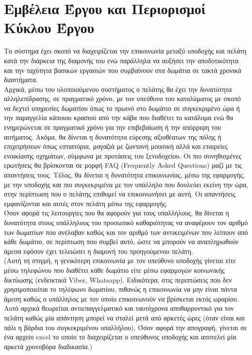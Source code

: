 \section{Εμβέλεια Έργου και Περιορισμοί Κύκλου Έργου}		
Το σύστημα έχει σκοπό να διαχειρίζεται την επικοινωνία μεταξύ υποδοχής και πελάτη κατά την διάρκεια 
της διαμονής του ενώ παράλληλα να αυξήσει την αποδοτικότητα και την ταχύτητα βασικών εργασιών που 
συμβαίνουν στα δωμάτια σε τακτά χρονικά διαστήματα.\\

\noindent
Αρχικά, μέσω του υλοποιούμενου συστήματος ο πελάτης θα έχει την δυνατότητα αλληλεπίδρασης, σε 
πραγματικό χρόνο, με τον υπεύθυνο του καταλύματος με σκοπό να δεχτεί υπηρεσίες δωματίου όπως το 
πρωινό στο δωμάτιο σε συγκεκριμένο ώρα ή την παραγγελία κάποιου κρασιού από την κάβα που διαθέτει το 
κατάλυμα ενώ θα ενημερώνεται σε πραγματικό χρόνο για την επιβεβαίωση ή την απόρριψη του αιτήματος. 
Ακόμα, θα δίνεται η δυνατότητα εύρεσης αξιοθέατων της πόλης ή επιχειρήσεων όπως εστιατόρια, μαγαζιά 
με ζωντανή μουσική αλλά και εταιρείες ενοικίασης οχημάτων, σύμφωνα με προτάσεις του ξενοδοχείου. Οι 
πιο συνηθισμένες ερωτήσεις θα βρίσκονται σε μορφή FAQ (Frequently Asked Questions) μαζί με τις 
απαντήσεις τους. Τέλος, θα δίνεται η δυνατότητα επικοινωνίας, μέσω της εφαρμογής, με την υποδοχής και 
πιο συγκεκριμένα με τον υπάλληλο που δουλεύει εκείνη την ώρα, στην περίπτωση που ο πελάτης επιθυμεί 
να επικοινωνήσει με αυτή. Οι απαντήσεις εμφανίζονται και αυτές στον πελάτη μέσω της εφαρμογής. \\

\noindent
Όσον αφορά τις λειτουργίες που θα αφορούν για τους υπαλλήλους, θα δίνεται η δυνατότητα στους 
υπάλληλους του προσωπικό καθαριότητας να αναφέρουν τον αριθμό των δωματίων που ανέλαβαν καθώς και τον 
αριθμό των αντικειμένων που λείπουν από κάθε δωμάτιο, σε περίπτωση που συμβεί αυτό, ώστε να μπορούν 
να αναπληρωθούν άμεσα εφόσον έχει τελειώσει η διαμονή του προηγούμενου πελάτη. \\

\noindent
(Αυτή τη στιγμή, η γενικότερη επικοινωνία με τον υπεύθυνο υποδοχής γίνεται είτε μέσω τηλεφώνου που 
διαθέτει κάθε δωμάτιο είτε μέσω εφαρμογών κοινωνικής δικτύωσης (ενδεικτικά Viber, Whatsapp). 
Ειδικότερα, στις περιπτώσεις που δεν χρησιμοποιείται το τηλέφωνο δωματίου, πιθανώς η επικοινωνία να 
μην είναι πάντα άμεση καθώς ο υπάλληλος με τον οποίο επικοινωνούν να βρίσκεται εκτός ωραρίου. Αυτό 
αρχικά θεωρείται αντιεπαγγελματικό και ταυτόχρονα αποθαρρυντικό για τον πελάτη καθώς μία απάντηση 
μπορεί να σταλεί μετά από αρκετές ώρες (όταν είναι και πάλι η βάρδια του συγκεκριμένου υπαλλήλου). 
Όσον αφορά την απογραφή, γίνεται σε ένα αρχείο excel το οποίο το  διαχειρίζεται ο υπεύθυνος υποδοχής 
και αποτελεί μία αρκετά χρονοβόρα διαδικασία.) \\

